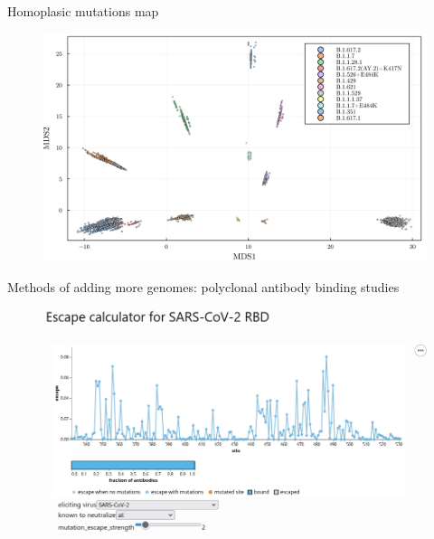 \documentclass{beamer}
\begin{document}
\begin{frame}{Homoplasic mutations map}
    \begin{figure}
        \includegraphics[width=\textwidth]{my_figs/usa_multidimensional_scaling_snps.png}
    \end{figure}
\end{frame}

\begin{frame}{Methods of adding more genomes: polyclonal antibody binding studies}
    \begin{figure}
        \includegraphics[width=\textwidth]{standalone/2022-07-06-13-06-32.png}
    \end{figure}
    \centering
\vfill
\tiny{\cite{greaney2022antibody}}
\end{frame}
\end{document}
